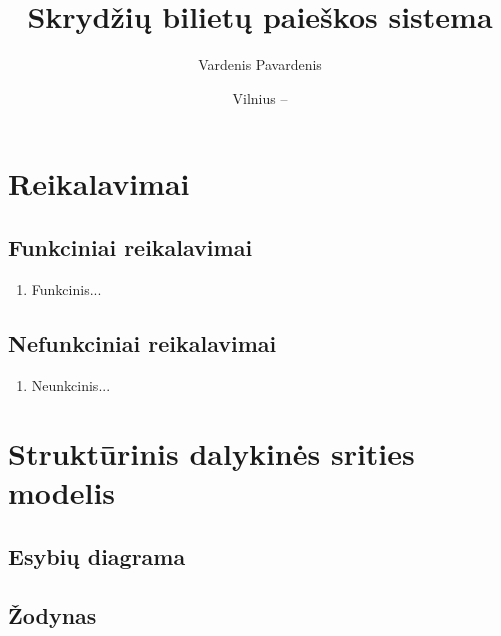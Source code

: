 \documentclass{VUMIFPSkursinis}
\title{Skrydžių bilietų paieškos sistema}
\author{Vardenis Pavardenis}
\date{Vilnius – \the\year}
\begin{document}
\maketitle
  
    \tableofcontents
  
  
    \section{Reikalavimai}
        \subsection{Funkciniai reikalavimai}
            \begin{enumerate}[label=FR\arabic*.]
                \item Funkcinis...
            \end{enumerate}
        \subsection{Nefunkciniai reikalavimai}
            \begin{enumerate}[label=NFR\arabic*.]
                \item Neunkcinis...
            \end{enumerate}
  
    \section{Struktūrinis dalykinės srities modelis}
        \subsection{Esybių diagrama}

        \subsection{Žodynas}
\end{document}

